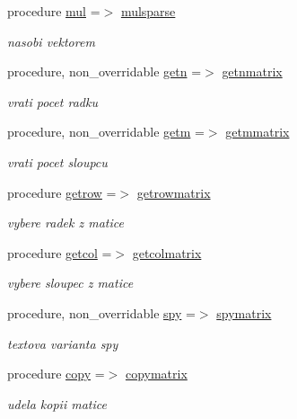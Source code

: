 \begin{DoxyCompactItemize}
procedure \hyperlink{structmtx_1_1smtx_a799fca1825561095bdb5a3342fb88a21}{mul} =$>$ \hyperlink{classmtx_a05af464426600e96615bc292a3ecfc77}{mulsparse}
\begin{DoxyCompactList}\small\item\em nasobi vektorem \end{DoxyCompactList}\item 
procedure, non\-\_\-overridable \hyperlink{structmtx_1_1matrix_ad43a73f32b347da18f997ce145d6c27c}{getn} =$>$ \hyperlink{classmtx_ab05f486a31448c69570e2144b4010957}{getnmatrix}
\begin{DoxyCompactList}\small\item\em vrati pocet radku \end{DoxyCompactList}\item 
procedure, non\-\_\-overridable \hyperlink{structmtx_1_1matrix_a24f1071ad0cb83094ba23d3027321392}{getm} =$>$ \hyperlink{classmtx_adf266f7c4ef90f6ddc1c654bcad5d149}{getmmatrix}
\begin{DoxyCompactList}\small\item\em vrati pocet sloupcu \end{DoxyCompactList}\item 
procedure \hyperlink{structmtx_1_1matrix_a99c4dff8cf1c63a968d03474084d0b70}{getrow} =$>$ \hyperlink{classmtx_a46e5fd9002257990ea5c79e1971c8167}{getrowmatrix}
\begin{DoxyCompactList}\small\item\em vybere radek z matice \end{DoxyCompactList}\item 
procedure \hyperlink{structmtx_1_1matrix_af9d60c003f797c73085241d8c38ea792}{getcol} =$>$ \hyperlink{classmtx_abb68e8d5a8216a50b88e5c577b5ad403}{getcolmatrix}
\begin{DoxyCompactList}\small\item\em vybere sloupec z matice \end{DoxyCompactList}\item 
procedure, non\-\_\-overridable \hyperlink{structmtx_1_1matrix_a244598586f2b4d2de61eb827c6349485}{spy} =$>$ \hyperlink{classmtx_afba151bbf31e292a36f36279c0d74cf2}{spymatrix}
\begin{DoxyCompactList}\small\item\em textova varianta spy \end{DoxyCompactList}\item 
procedure \hyperlink{structmtx_1_1matrix_a54be9493d99d3be7246d31d46e21fd72}{copy} =$>$ \hyperlink{classmtx_add2b7c4a3a806aebca088907544db1e0}{copymatrix}
\begin{DoxyCompactList}\small\item\em udela kopii matice \end{DoxyCompactList}\end{DoxyCompactItemize}
